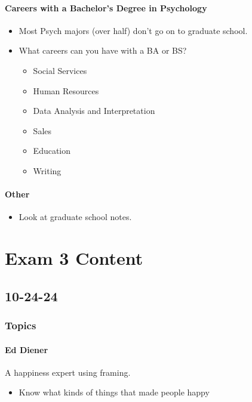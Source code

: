 \documentclass{report}
\begin{document}
\subsubsection{Careers with a Bachelor's Degree in Psychology}

\begin{itemize}
    \item Most Psych majors (over half) don't go on to graduate school.
    \item What careers can you have with a BA or BS? 
    \begin{itemize}
        \item Social Services
        \item Human Resources
        \item Data Analysis and Interpretation 
        \item Sales
        \item Education 
        \item Writing
    \end{itemize}
\end{itemize}

\subsubsection{Other}

\begin{itemize}
    \item Look at graduate school notes.
\end{itemize}

\chapter{Exam 3 Content}

\section{10-24-24}

\subsection{Topics}

\subsubsection{Ed Diener}
A happiness expert using framing.
\begin{itemize}
 \item Know what kinds of things that made people happy 
\end{itemize}
\end{document}
